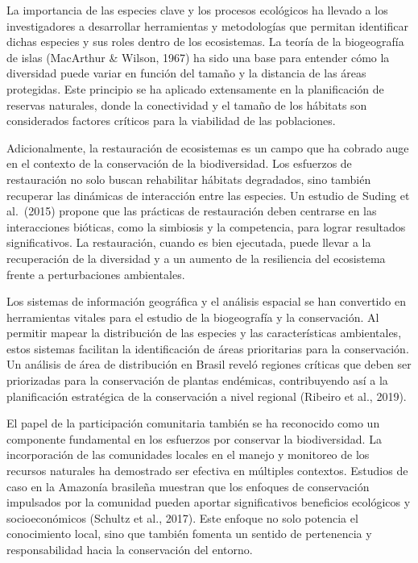 \documentclass[
  letterpaper,
  DIV=11,
  numbers=noendperiod,
  oneside]{scrreprt}
\begin{document}
La importancia de las especies clave y los procesos ecológicos ha
llevado a los investigadores a desarrollar herramientas y metodologías
que permitan identificar dichas especies y sus roles dentro de los
ecosistemas. La teoría de la biogeografía de islas (MacArthur \& Wilson,
1967) ha sido una base para entender cómo la diversidad puede variar en
función del tamaño y la distancia de las áreas protegidas. Este
principio se ha aplicado extensamente en la planificación de reservas
naturales, donde la conectividad y el tamaño de los hábitats son
considerados factores críticos para la viabilidad de las poblaciones.

Adicionalmente, la restauración de ecosistemas es un campo que ha
cobrado auge en el contexto de la conservación de la biodiversidad. Los
esfuerzos de restauración no solo buscan rehabilitar hábitats
degradados, sino también recuperar las dinámicas de interacción entre
las especies. Un estudio de Suding et al.~(2015) propone que las
prácticas de restauración deben centrarse en las interacciones bióticas,
como la simbiosis y la competencia, para lograr resultados
significativos. La restauración, cuando es bien ejecutada, puede llevar
a la recuperación de la diversidad y a un aumento de la resiliencia del
ecosistema frente a perturbaciones ambientales.

Los sistemas de información geográfica y el análisis espacial se han
convertido en herramientas vitales para el estudio de la biogeografía y
la conservación. Al permitir mapear la distribución de las especies y
las características ambientales, estos sistemas facilitan la
identificación de áreas prioritarias para la conservación. Un análisis
de área de distribución en Brasil reveló regiones críticas que deben ser
priorizadas para la conservación de plantas endémicas, contribuyendo así
a la planificación estratégica de la conservación a nivel regional
(Ribeiro et al., 2019).

El papel de la participación comunitaria también se ha reconocido como
un componente fundamental en los esfuerzos por conservar la
biodiversidad. La incorporación de las comunidades locales en el manejo
y monitoreo de los recursos naturales ha demostrado ser efectiva en
múltiples contextos. Estudios de caso en la Amazonía brasileña muestran
que los enfoques de conservación impulsados por la comunidad pueden
aportar significativos beneficios ecológicos y socioeconómicos (Schultz
et al., 2017). Este enfoque no solo potencia el conocimiento local, sino
que también fomenta un sentido de pertenencia y responsabilidad hacia la
conservación del entorno.
\end{document}
